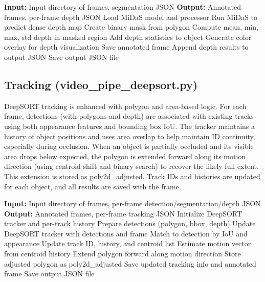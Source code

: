 \documentclass[12pt,a4paper]{report}
\theoremstyle{definition}
\theoremstyle{remark}
\begin{document}
\begin{algorithm}[H]
\caption{MiDaS Depth Estimation Pipeline}
\label{alg:depth}
\begin{algorithmic}[1]
\State \textbf{Input:} Input directory of frames, segmentation JSON
\State \textbf{Output:} Annotated frames, per-frame depth JSON
\State Load MiDaS model and processor
    \State Run MiDaS to predict dense depth map
        \State Create binary mask from polygon
        \State Compute mean, min, max, std depth in masked region
        \State Add depth statistics to object
    \EndFor
    \State Generate color overlay for depth visualization
    \State Save annotated frame
    \State Append depth results to output JSON
\EndFor
\State Save output JSON file
\end{algorithmic}
\end{algorithm}

\subsection{Tracking (video\_pipe\_deepsort.py)}
DeepSORT tracking is enhanced with polygon and area-based logic. For each frame, detections (with polygons and depth) are associated with existing tracks using both appearance features and bounding box IoU. The tracker maintains a history of object positions and uses area overlap to help maintain ID continuity, especially during occlusion. When an object is partially occluded and its visible area drops below expected, the polygon is extended forward along its motion direction (using centroid shift and binary search) to recover the likely full extent. This extension is stored as poly2d\_adjusted. Track IDs and histories are updated for each object, and all results are saved with the frame.

\begin{algorithm}[H]
\caption{DeepSORT Tracking and Polygon Adjustment}
\label{alg:tracking}
\begin{algorithmic}[1]
\State \textbf{Input:} Input directory of frames, per-frame detection/segmentation/depth JSON
\State \textbf{Output:} Annotated frames, per-frame tracking JSON
\State Initialize DeepSORT tracker and per-track history
    \State Prepare detections (polygon, bbox, depth)
    \State Update DeepSORT tracker with detections and frame
        \State Match to detection by IoU and appearance
        \State Update track ID, history, and centroid list
            \State Estimate motion vector from centroid history
            \State Extend polygon forward along motion direction
            \State Store adjusted polygon as poly2d\_adjusted
        \EndIf
    \EndFor
    \State Save updated tracking info and annotated frame
\EndFor
\State Save output JSON file
\end{algorithmic}
\end{algorithm}
\end{document}

